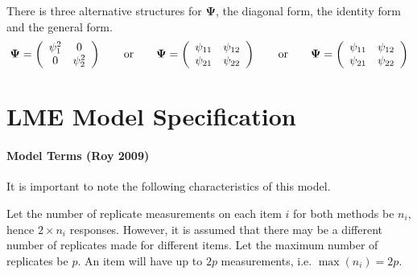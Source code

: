 \documentclass[12pt, a4paper]{report}
\theoremstyle{plain}
\theoremstyle{definition}
\theoremstyle{remark}
\begin{document}
There is three alternative structures for
$\boldsymbol{\Psi}$, the diagonal form, the identity form and the general form.
\[
\boldsymbol{\Psi} =
\left(%
\begin{array}{c c}
\psi^2_1 & 0  \\
0 & \psi^2_2  \\
\end{array}%
\right)\qquad \mathrm{or} \qquad \boldsymbol{\Psi} =
\left(%
\begin{array}{c c}
\psi_{11} & \psi_{12}  \\
\psi_{21} & \psi_{22}  \\
\end{array}%
\right)
\qquad \mathrm{or} \qquad \boldsymbol{\Psi} =
\left(%
\begin{array}{c c}
\psi_{11} & \psi_{12}  \\
\psi_{21} & \psi_{22}  \\
\end{array}%
\right)
\]







\chapter{LME Model Specification}

\subsubsection{Model Terms (Roy 2009)}
It is important to note the following characteristics of this model.

Let the number of replicate measurements on each item $i$ for both methods be $n_i$, hence $2 \times n_i$ responses. However, it is assumed that there may be a different number of replicates made for different items. Let the maximum number of replicates be $p$. An item will have up to $2p$ measurements, i.e. $\max(n_{i}) = 2p$.

\end{document}

